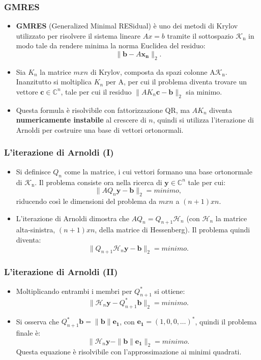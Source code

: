 \documentclass[10pt]{beamer}
\begin{document}
\begin{frame} \frametitle{GMRES}
\begin{itemize}
    \item \textbf{GMRES} (Generalized Minimal RESidual) è uno dei metodi di Krylov utilizzato per risolvere il sistema lineare $Ax = b$ tramite il sottospazio
    $\mathcal{K}_\mathrm{n}$ in modo tale da rendere minima la norma Euclidea del residuo: $$\|\mathbf{b}-A\mathbf{x_n}\|_2.$$
    \item Sia $K_n$ la matrice $m x n$ di Krylov, composta da spazi colonne A$\mathcal{K}_\mathrm{n}$. Inanzitutto si moltiplica $K_n$ per A, per cui il problema diventa trovare un vettore $\mathbf{c}\in\mathbb{C}^n$, tale per cui il residuo $\|AK_n\mathbf{c}-\mathbf{b}\|_2$ sia minimo. 
    \item Questa formula è risolvibile con fattorizzazione QR, ma $AK_n$ diventa \textbf{numericamente instabile} al crescere di $n$, quindi si utilizza \alert{l'iterazione di Arnoldi} per costruire una base di vettori ortonormali.
\end{itemize}
\end{frame}


\begin{frame} \frametitle{L'iterazione di Arnoldi (I)}
\begin{itemize}
    \item Si definisce $Q_n$ come la matrice, i cui vettori formano una base ortonormale di $\mathcal{K}_\mathrm{n}$. Il problema consiste ora nella ricerca di $\mathbf{y}\in\mathbb{C}^n$ tale per cui: $$\|AQ_n\mathbf{y}-\mathbf{b}\|_2 = minimo,$$ riducendo così le dimensioni del problema da $m x n$ a $(n+1) x n$.
    \item L'iterazione di Arnoldi dimostra che $AQ_n = Q_{n+1}\mathcal{H}_n$ (con $\mathcal{H}_n$ la matrice alta-sinistra, $(n+1) x n$, della matrice di Hessenberg). Il problema quindi diventa:$$\|Q_{n+1}\mathcal{H}_n\mathbf{y}-\mathbf{b}\|_2 = minimo.$$ 
\end{itemize}
\end{frame}


\begin{frame} \frametitle{L'iterazione di Arnoldi (II)}
\begin{itemize}
    \item Moltiplicando entrambi i membri per $Q^*_{n+1}$ si ottiene: $$\|\mathcal{H}_n\mathbf{y}-Q^*_{n+1}\mathbf{b}\|_2 = minimo.$$
    \item Si osserva che $Q^*_{n+1}\mathbf{b}=\|\mathbf{b}\|\mathbf{e_1}$, con $\mathbf{e_1}=(1,0,0,\dots)^*$, quindi il problema 
    finale è:$$\|\mathcal{H}_n\mathbf{y}-\|\mathbf{b}\|\mathbf{e_1}\|_2 = minimo.$$ Questa equazione è risolvibile con l'approssimazione ai minimi quadrati.
\end{itemize}
\end{frame}
\end{document}
